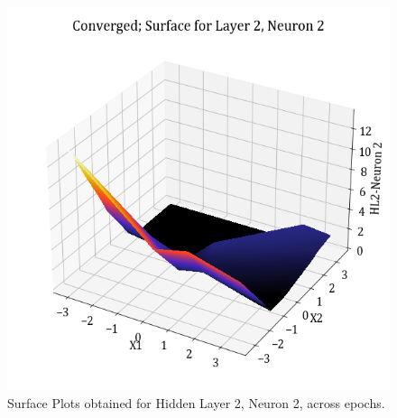 \documentclass[11pt,a4paper]{article}
\begin{document}
\begin{figure}[H]
    \includegraphics[scale=0.4]{images/1B_MLFFNN_conv_HL2_N2.png}
    \caption{Surface Plots obtained for Hidden Layer 2, Neuron 2, across epochs.}
\end{figure}
\end{document}
